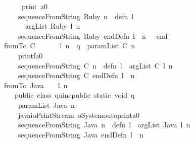 \documentclass[12pt]{article}
\begin{document}
\begin{tabbing}
\ttfamily ~~~~~~~~print~a0~\\
\ttfamily ~~~~~~~sequenceFromString~Ruby~n~~defn~l~\\
\ttfamily ~~~~~~~~~argList~Ruby~l~n~~~\\
\ttfamily ~~~~~~~sequenceFromString~Ruby~endDefn~l~~n~~~end\\
\ttfamily ~~~fromTo~C~~~~~~~l~n~~q~~paramList~C~n~~~\\
\ttfamily ~~~~~~~printfa0~\\
\ttfamily ~~~~~~~sequenceFromString~C~n~~defn~l~~argList~C~l~n~\\
\ttfamily ~~~~~~~sequenceFromString~C~endDefn~l~~n~~\\
\ttfamily ~~~fromTo~Java~~~~l~n~\\
\ttfamily ~~~~~~public~class~quinepublic~static~void~q~\\
\ttfamily ~~~~~~~paramList~Java~n~\\
\ttfamily ~~~~~~~javaioPrintStream~oSystemoutoprinta0~\\
\ttfamily ~~~~~~~sequenceFromString~Java~n~~defn~l~~argList~Java~l~n~\\
\ttfamily ~~~~~~~sequenceFromString~Java~endDefn~l~~n~~
\end{tabbing}
\end{document}
